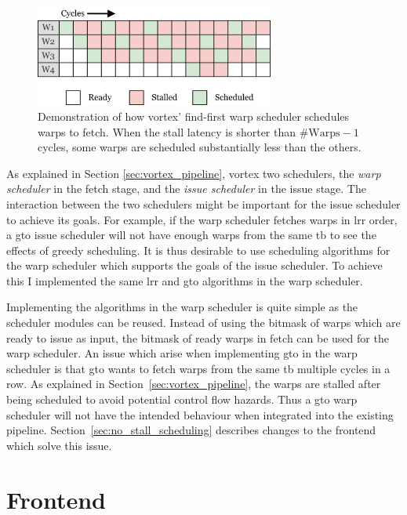 \begin{figure}
    \centering
    \includegraphics[width=0.7\textwidth]{figures/find-first-scheduling.png}
    \caption[Demonstration of \Gls{vortex}' find-first warp scheduler.]{Demonstration of how \Gls{vortex}' find-first warp scheduler schedules warps to fetch. When the stall latency is shorter than $\text{\#Warps} - 1$ cycles, some warps are scheduled substantially less than the others.}
    \label{fig:find_first_scheduling}
\end{figure}

As explained in Section \ref{sec:vortex_pipeline}, \Gls{vortex} two schedulers, the \textit{warp scheduler} in the fetch stage, and the \textit{issue scheduler} in the issue stage. The interaction between the two schedulers might be important for the issue scheduler to achieve its goals. For example, if the warp scheduler fetches warps in \acrshort{lrr} order, a \acrshort{gto} issue scheduler will not have enough warps from the same \acrshort{tb} to see the effects of greedy scheduling. It is thus desirable to use scheduling algorithms for the warp scheduler which supports the goals of the issue scheduler. To achieve this I implemented the same \acrshort{lrr} and \acrshort{gto} algorithms in the warp scheduler.

Implementing the algorithms in the warp scheduler is quite simple as the scheduler modules can be reused. Instead of using the bitmask of warps which are ready to issue as input, the bitmask of ready warps in fetch can be used for the warp scheduler. An issue which arise when implementing \acrshort{gto} in the warp scheduler is that \acrshort{gto} wants to fetch warps from the same \acrshort{tb} multiple cycles in a row. As explained in Section~\ref{sec:vortex_pipeline}, the warps are stalled after being scheduled to avoid potential control flow hazards. Thus a \acrshort{gto} warp scheduler will not have the intended behaviour when integrated into the existing pipeline. Section~\ref{sec:no_stall_scheduling} describes changes to the frontend which solve this issue.

\section{Frontend}

